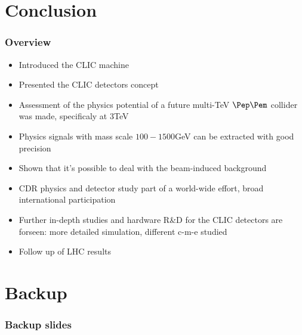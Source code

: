 \documentclass{beamer}
\begin{document}
\section{Conclusion}
\begin{frame}
\frametitle{Overview}
\begin{itemize}
  \item Introduced the CLIC machine
  \item Presented the CLIC detectors concept
  \item Assessment of the physics potential of a future multi-TeV $\Pep\Pem$
  collider was made, specificaly at 3TeV
  \item Physics signals with mass scale $100-1500$GeV can be extracted with good
  precision
  \item Shown that it's possible to deal with the beam-induced background
  \item CDR physics and detector study part of a world-wide effort, broad
  international participation
  \item Further in-depth studies and hardware R\&D for the CLIC detectors are
  forseen: more detailed simulation, different c-m-e studied
  \item Follow up of LHC results
\end{itemize}
\end{frame}

\appendix
\section{Backup}
\begin{frame}
\frametitle{Backup slides}
\end{frame}
\end{document}
